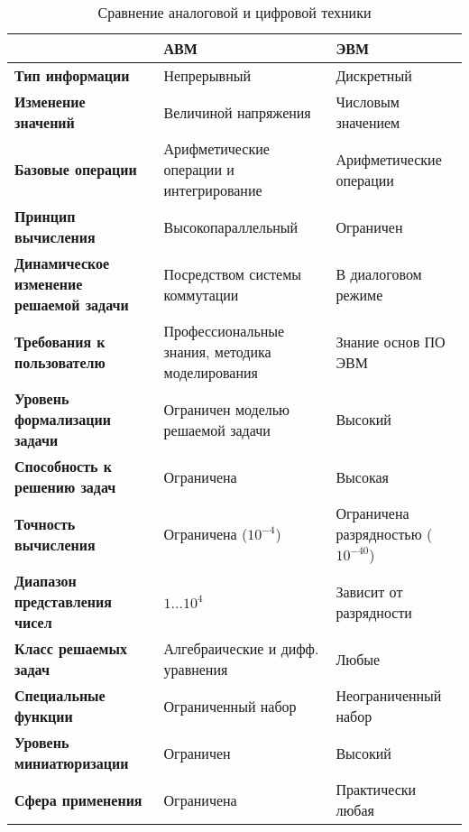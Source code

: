 \begin{table}[H]
    \renewcommand{\arraystretch}{1.5}
    \caption{Сравнение аналоговой и цифровой техники}
    \begin{tabularx}{\textwidth} {
            >{\raggedright\arraybackslash}X
            >{\centering\arraybackslash}X
            >{\centering\arraybackslash}X}
        \toprule
                                                        & \textbf{АВМ}                                    & \textbf{ЭВМ}                         \\
        \midrule
        \textbf{Тип информации}                         & Непрерывный                                     & Дискретный                           \\
        \textbf{Изменение значений}                     & Величиной напряжения                            & Числовым значением                   \\
        \textbf{Базовые операции}                       & Арифметические операции и интегрирование        & Арифметические операции              \\
        \textbf{Принцип вычисления}                     & Высокопараллельный                              & Ограничен                            \\
        \textbf{Динамическое изменение решаемой задачи} & Посредством системы коммутации                  & В диалоговом режиме                  \\
        \textbf{Требования к пользователю}              & Профессиональные знания, методика моделирования & Знание основ ПО ЭВМ                  \\
        \textbf{Уровень формализации задачи}            & Ограничен моделью решаемой задачи               & Высокий                              \\
        \textbf{Способность к решению задач}            & Ограничена                                      & Высокая                              \\
        \textbf{Точность вычисления}                    & Ограничена ($10^{-4}$)                          & Ограничена разрядностью ($10^{-40}$) \\
        \textbf{Диапазон представления чисел}           & $1\dots10^4$                                    & Зависит от разрядности               \\
        \textbf{Класс решаемых задач}                   & Алгебраические и дифф. уравнения                & Любые                                \\
        \textbf{Специальные функции}                    & Ограниченный набор                              & Неограниченный набор                 \\
        \textbf{Уровень миниатюризации}                 & Ограничен                                       & Высокий                              \\
        \textbf{Сфера применения}                       & Ограничена                                      & Практически любая                    \\
        \bottomrule
    \end{tabularx}
\end{table}

